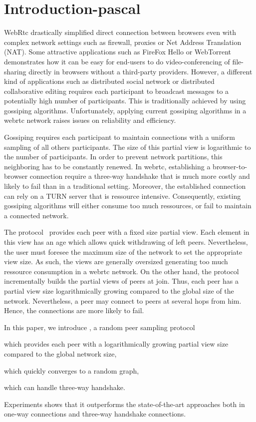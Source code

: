 
\section{Introduction-pascal}

WebRtc drastically simplified direct connection between browsers even
with complex network settings such as firewall, proxies or Net Address
Translation (NAT).  Some attractive applications such as FireFox Hello
or WebTorrent demonstrates how it can be easy for end-users to do
video-conferencing of file-sharing directly in browsers without a
third-party providers. However, a different kind of applications such
as distributed social network or distributed collaborative editing
requires each participant to broadcast messages to a potentially high
number of participants. This is traditionally achieved by using
gossiping algorithms. Unfortunately, applying current gossiping
algorithms in a webrtc network raises issues on reliability and
efficiency. 

Gossiping requires each participant to maintain connections with a
uniform sampling of all others participants. The size of this partial
view is logarithmic to the number of participants. In order to prevent
network partitions, this neighboring has to be constantly renewed. In
webrtc, establishing a browser-to-browser connection require a
three-way handshake that is much more costly and likely to fail than
in a traditional setting. Moreover, the established connection can
rely on a TURN server that is ressource intensive.  Consequently,
existing gossiping algorithms will either consume too much ressources,
or fail to maintain a connected network.

The \CYCLON{} protocol~\cite{voulgaris2005cyclon} provides each peer
with a fixed size partial view.  Each element in this view has an age
which allows quick withdrawing of left peers. Nevertheless, the user
must foresee the maximum size of the network to set the appropriate
view size. As such, the views are generally oversized generating too
much ressource consumption in a webrtc network. On the other hand, the
\SCAMP{} protocol~\cite{ganesh2001scamp,ganesh2003peer} incrementally
builds the partial views of peers at join. Thus, each peer has a
partial view size logarithmically growing compared to the global size
of the network. Nevertheless, a peer may connect to peers at several
hops from him. Hence, the connections are more likely to fail.

In this paper, we introduce \SCAMPLON{}, a random peer sampling protocol
\begin{inparaenum}[(i)]
\item which provides each peer with a logarithmically growing partial view size
  compared to the global network size,
\item which quickly converges to a random graph,
\item which can handle three-way handshake.
\end{inparaenum}
Experiments shows that it outperforms the state-of-the-art approaches both in
one-way connections and three-way handshake connections.

